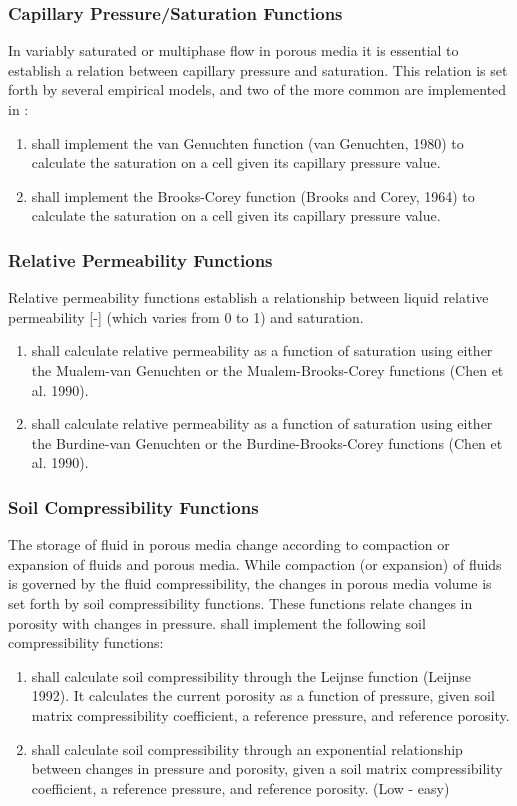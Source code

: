 \subsubsection{Capillary Pressure/Saturation Functions}
In variably saturated or multiphase flow in porous media it is essential to establish a relation between capillary pressure and saturation. This relation is set forth by several empirical models, and two of the more common are implemented in \pft:
\begin{enumerate}[resume]
	\item \label{vanGen} \pft shall implement the van Genuchten function (van Genuchten, 1980) to calculate the saturation on a cell given its capillary pressure value.
	\item \label{brCorey} \pft shall implement the Brooks-Corey function (Brooks and Corey,  1964) to calculate the saturation on a cell given its capillary pressure value.
\end{enumerate}

\subsubsection{Relative Permeability Functions}

Relative permeability functions establish a relationship between liquid relative permeability [-] (which varies from 0 to 1) and saturation.  
\begin{enumerate}[resume]
	\item \label{mualem} \pft shall calculate relative permeability as a function of saturation using either the Mualem-van Genuchten or the Mualem-Brooks-Corey functions (Chen et al. 1990). 
	\item \label{burdine} \pft shall calculate relative permeability as a function of saturation using either the Burdine-van Genuchten or the Burdine-Brooks-Corey functions (Chen et al. 1990). 
\end{enumerate}

\subsubsection{Soil Compressibility Functions}
The storage of fluid in porous media change according to compaction or expansion of fluids and porous media. While compaction (or expansion) of fluids is governed by the fluid compressibility, the changes in porous media volume is set forth by soil compressibility functions. These functions relate changes in porosity with changes in pressure. \pft shall implement the following soil compressibility functions:
\begin{enumerate}[resume]
	\item \label{leijnse} \pft shall calculate soil compressibility through the Leijnse function (Leijnse 1992). It calculates the current porosity as a function of pressure, given soil matrix compressibility coefficient, a reference pressure, and reference porosity.
	\item \label{exponential} \pft shall calculate soil compressibility through an exponential relationship between changes in pressure and porosity, given a soil matrix compressibility coefficient, a reference pressure, and reference porosity. (Low - easy)
\end{enumerate}
